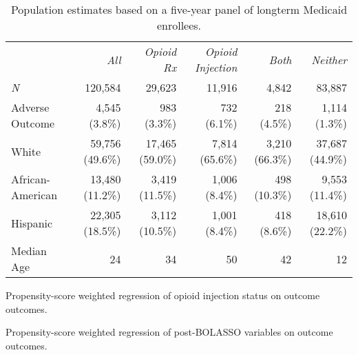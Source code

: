\documentclass[9pt,twoside]{pnas-new}
\begin{document}
\begin{table}
\caption{Population estimates based on a five-year panel of longterm Medicaid enrollees.}
\centering
\begin{tabular}{lrrrrr}
 & \em All & \em Opioid Rx & \em Opioid Injection & \em Both & \em Neither \\[0.5em]
\em N & 120,584 & 29,623 & 11,916 & 4,842 & 83,887 \\
Adverse Outcome & 4,545 (3.8\%) & 983 (3.3\%) & 732 (6.1\%) & 218 (4.5\%) & 1,114 (1.3\%) \\
White & 59,756 (49.6\%) & 17,465 (59.0\%) & 7,814 (65.6\%) & 3,210 (66.3\%) & 37,687 (44.9\%) \\
African-American & 13,480 (11.2\%) & 3,419 (11.5\%) & 1,006 (8.4\%) & 498 (10.3\%) & 9,553 (11.4\%) \\
Hispanic & 22,305 (18.5\%) & 3,112 (10.5\%) & 1,001 (8.4\%) & 418 (8.6\%) & 18,610 (22.2\%) \\
Median Age & 24 & 34 & 50 & 42 & 12
\end{tabular}
\end{table}

\begin{table}
\caption{Propensity-score weighted regression of opioid injection status on outcome outcomes.}
\centering
\small

\end{table}

\begin{table}
\caption{Propensity-score weighted regression of post-BOLASSO variables on outcome outcomes.}
\centering
\small

\end{table}
\end{document}
